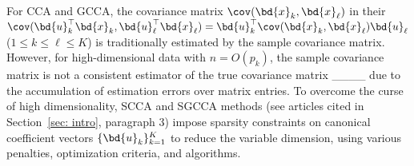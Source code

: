  
 \iffalse
 which are called . For example, 
the well-known maximum variance (MAXVAR) criterion ____
solves the optimization problem presented in Equation (\ref{eqgcca}) by defining a shared representation $\bd{g}\in \mathbb{R}^n$ of $K$ different data views $\{\mb{X}_k\in\mathbb{R}^{p_k\times n}\}_{k=1}^K$. The equation is described as:
\begin{align}
        \min_{\bd{u}_k \in \mathbb{R}^{p_k }, \bd{g} \in \mathbb{R}^{ n}} \sum_{k=1}^K\|\bd{g}^\top - \bd{u}_k^\top\mb{X}_k\|_2^2\label{eqgcca}
        \\s.t. \quad \bd{g}^\top\bd{g}/n= 1. \nonumber
\end{align}
____ proposed regularized generalized CCA (RGCCA), which provides a unified framework for $K$ multiview data source. The RGCCA optimization problem can be expressed as:
\begin{align}
    \underset{\bd{u}_1,\dots, \bd{u}_K}{{\max}\, } \sum_{1\le j \neq k\le K} c_{jk}g(Cov(\bd{u}_j^\top\mb{X}_j,\bd{u}_k^\top\mb{X}_k)),\label{eqrgcca}
    \\s.t.\quad \bd{u}_\ell^\top\mb{X}_\ell\mb{X}_\ell^\top\bd{u}_\ell=1,\quad \ell = 1,...,K, \nonumber
\end{align}
where $g$ is a convex differentiable function and the matrix $\mb{C} = (c_{jk})$ is a $K \times K$ symmetric matrix with positive elements specifying the desired connection design of study association between the blocks.
\fi



For CCA and GCCA,
the covariance matrix  
$\cov(\bd{x}_k,\bd{x}_\ell)$
in their
$
\cov(\bd{u}_k^\top\bd{x}_k,\bd{u}_\ell^\top\bd{x}_\ell)  
=\bd{u}_k^\top
\cov(\bd{x}_k,\bd{x}_\ell) \bd{u}_\ell
$ ($1\le k\le \ell\le K$)
is traditionally estimated by the
sample covariance matrix.
However, for high-dimensional data 
with $n=O(p_k)$,
the sample covariance matrix
is not a consistent estimator of the true covariance matrix ____
due to  the accumulation of estimation errors over matrix entries.
To overcome the  curse
of high dimensionality,
SCCA 
and 
SGCCA methods (see articles cited in Section~\ref{sec: intro}, {\color{black}paragraph 3})
impose sparsity constraints on 
 canonical coefficient vectors  $\{\bd{u}_k\}_{k=1}^K$
to reduce the variable dimension, using
various penalties, optimization criteria, and algorithms.


